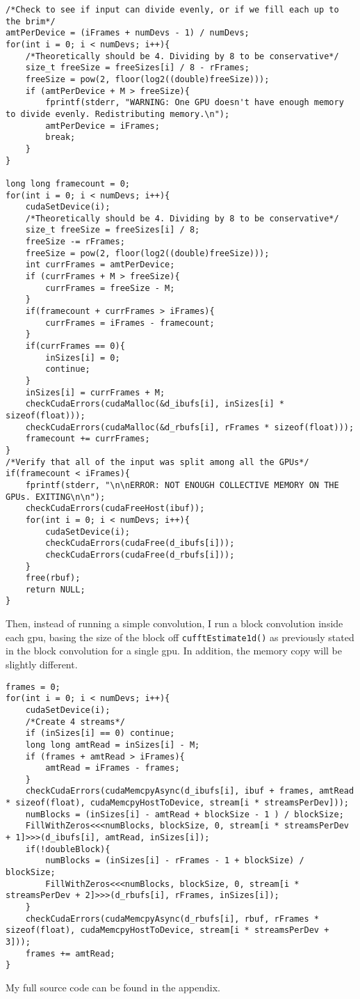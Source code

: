 \begin{verbatim}
/*Check to see if input can divide evenly, or if we fill each up to the brim*/
amtPerDevice = (iFrames + numDevs - 1) / numDevs;
for(int i = 0; i < numDevs; i++){
    /*Theoretically should be 4. Dividing by 8 to be conservative*/
    size_t freeSize = freeSizes[i] / 8 - rFrames;
    freeSize = pow(2, floor(log2((double)freeSize)));
    if (amtPerDevice + M > freeSize){
        fprintf(stderr, "WARNING: One GPU doesn't have enough memory to divide evenly. Redistributing memory.\n");
        amtPerDevice = iFrames;
        break;
    }
}
		
long long framecount = 0;
for(int i = 0; i < numDevs; i++){
	cudaSetDevice(i);
	/*Theoretically should be 4. Dividing by 8 to be conservative*/
	size_t freeSize = freeSizes[i] / 8;
	freeSize -= rFrames;
	freeSize = pow(2, floor(log2((double)freeSize)));
	int currFrames = amtPerDevice;
	if (currFrames + M > freeSize){
	    currFrames = freeSize - M;
	}
	if(framecount + currFrames > iFrames){
		currFrames = iFrames - framecount;
	}
	if(currFrames == 0){
		inSizes[i] = 0;
		continue;
	}
	inSizes[i] = currFrames + M;
	checkCudaErrors(cudaMalloc(&d_ibufs[i], inSizes[i] * sizeof(float)));
	checkCudaErrors(cudaMalloc(&d_rbufs[i], rFrames * sizeof(float)));
	framecount += currFrames;
}
/*Verify that all of the input was split among all the GPUs*/
if(framecount < iFrames){
    fprintf(stderr, "\n\nERROR: NOT ENOUGH COLLECTIVE MEMORY ON THE GPUs. EXITING\n\n");
	checkCudaErrors(cudaFreeHost(ibuf));
	for(int i = 0; i < numDevs; i++){
		cudaSetDevice(i);
		checkCudaErrors(cudaFree(d_ibufs[i]));
		checkCudaErrors(cudaFree(d_rbufs[i]));
	}
	free(rbuf);
	return NULL;
}
\end{verbatim}

Then, instead of running a simple convolution, I run a block convolution inside each \gls{gpu}, basing the size of the block off \verb|cufftEstimate1d()| as previously stated in the block convolution for a single \gls{gpu}. In addition, the memory copy will be slightly different.

\begin{verbatim}
frames = 0;
for(int i = 0; i < numDevs; i++){
	cudaSetDevice(i);
	/*Create 4 streams*/
	if (inSizes[i] == 0) continue;
	long long amtRead = inSizes[i] - M;
	if (frames + amtRead > iFrames){
		amtRead = iFrames - frames;
	}
	checkCudaErrors(cudaMemcpyAsync(d_ibufs[i], ibuf + frames, amtRead * sizeof(float), cudaMemcpyHostToDevice, stream[i * streamsPerDev]));
	numBlocks = (inSizes[i] - amtRead + blockSize - 1 ) / blockSize;
	FillWithZeros<<<numBlocks, blockSize, 0, stream[i * streamsPerDev + 1]>>>(d_ibufs[i], amtRead, inSizes[i]);
	if(!doubleBlock){	
		numBlocks = (inSizes[i] - rFrames - 1 + blockSize) / blockSize;
		FillWithZeros<<<numBlocks, blockSize, 0, stream[i * streamsPerDev + 2]>>>(d_rbufs[i], rFrames, inSizes[i]);
	}
	checkCudaErrors(cudaMemcpyAsync(d_rbufs[i], rbuf, rFrames * sizeof(float), cudaMemcpyHostToDevice, stream[i * streamsPerDev + 3]));
	frames += amtRead;
}
\end{verbatim}
\indent \par My full source code can be found in the appendix.